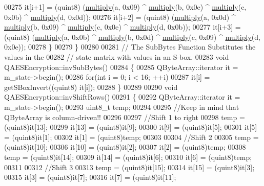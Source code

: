 \begin{DoxyCode}
00275     it[i+1] = (quint8) (\mbox{\hyperlink{qaesencryption_8cpp_adcc23c7a5520793f14710fff6ef23dfe}{multiply}}(a, 0x09) ^ \mbox{\hyperlink{qaesencryption_8cpp_adcc23c7a5520793f14710fff6ef23dfe}{multiply}}(b, 0x0e) ^ 
      \mbox{\hyperlink{qaesencryption_8cpp_adcc23c7a5520793f14710fff6ef23dfe}{multiply}}(c, 0x0b) ^ \mbox{\hyperlink{qaesencryption_8cpp_adcc23c7a5520793f14710fff6ef23dfe}{multiply}}(d, 0x0d));
00276     it[i+2] = (quint8) (\mbox{\hyperlink{qaesencryption_8cpp_adcc23c7a5520793f14710fff6ef23dfe}{multiply}}(a, 0x0d) ^ \mbox{\hyperlink{qaesencryption_8cpp_adcc23c7a5520793f14710fff6ef23dfe}{multiply}}(b, 0x09) ^ 
      \mbox{\hyperlink{qaesencryption_8cpp_adcc23c7a5520793f14710fff6ef23dfe}{multiply}}(c, 0x0e) ^ \mbox{\hyperlink{qaesencryption_8cpp_adcc23c7a5520793f14710fff6ef23dfe}{multiply}}(d, 0x0b));
00277     it[i+3] = (quint8) (\mbox{\hyperlink{qaesencryption_8cpp_adcc23c7a5520793f14710fff6ef23dfe}{multiply}}(a, 0x0b) ^ \mbox{\hyperlink{qaesencryption_8cpp_adcc23c7a5520793f14710fff6ef23dfe}{multiply}}(b, 0x0d) ^ 
      \mbox{\hyperlink{qaesencryption_8cpp_adcc23c7a5520793f14710fff6ef23dfe}{multiply}}(c, 0x09) ^ \mbox{\hyperlink{qaesencryption_8cpp_adcc23c7a5520793f14710fff6ef23dfe}{multiply}}(d, 0x0e));
00278   \}
00279 \}
00280 
00281 \textcolor{comment}{// The SubBytes Function Substitutes the values in the}
00282 \textcolor{comment}{// state matrix with values in an S-box.}
00283 \textcolor{keywordtype}{void} QAESEncryption::invSubBytes()
00284 \{
00285     QByteArray::iterator it = m\_state->begin();
00286     \textcolor{keywordflow}{for}(\textcolor{keywordtype}{int} i = 0; i < 16; ++i)
00287         it[i] = getSBoxInvert((quint8) it[i]);
00288 \}
00289 
00290 \textcolor{keywordtype}{void} QAESEncryption::invShiftRows()
00291 \{
00292     QByteArray::iterator it = m\_state->begin();
00293     uint8\_t temp;
00294 
00295     \textcolor{comment}{//Keep in mind that QByteArray is column-driven!!}
00296 
00297     \textcolor{comment}{//Shift 1 to right}
00298     temp   = (quint8)it[13];
00299     it[13] = (quint8)it[9];
00300     it[9]  = (quint8)it[5];
00301     it[5]  = (quint8)it[1];
00302     it[1]  = (quint8)temp;
00303 
00304     \textcolor{comment}{//Shift 2}
00305     temp   = (quint8)it[10];
00306     it[10] = (quint8)it[2];
00307     it[2]  = (quint8)temp;
00308     temp   = (quint8)it[14];
00309     it[14] = (quint8)it[6];
00310     it[6]  = (quint8)temp;
00311 
00312     \textcolor{comment}{//Shift 3}
00313     temp   = (quint8)it[15];
00314     it[15] = (quint8)it[3];
00315     it[3]  = (quint8)it[7];
00316     it[7]  = (quint8)it[11];

\end{DoxyCode}
